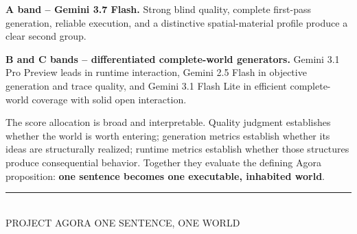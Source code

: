 \documentclass[11pt,a4paper]{article}
\begin{document}
\vspace{3mm}
\colorbox{AgoraPaleCoral}{%
  \parbox{0.96\textwidth}{%
    \vspace{3mm}\hspace{3mm}\begin{minipage}{0.91\textwidth}
    \sffamily\color{AgoraInk}
    \textbf{A band -- Gemini 3.7 Flash.} Strong blind quality, complete first-pass generation,
    reliable execution, and a distinctive spatial-material profile produce a clear second group.
    \end{minipage}\vspace{3mm}}}

\vspace{3mm}
\colorbox{AgoraPaleGold}{%
  \parbox{0.96\textwidth}{%
    \vspace{3mm}\hspace{3mm}\begin{minipage}{0.91\textwidth}
    \sffamily\color{AgoraInk}
    \textbf{B and C bands -- differentiated complete-world generators.} Gemini 3.1 Pro Preview
    leads in runtime interaction, Gemini 2.5 Flash in objective generation and trace quality, and
    Gemini 3.1 Flash Lite in efficient complete-world coverage with solid open interaction.
    \end{minipage}\vspace{3mm}}}

\vspace{5mm}
The score allocation is broad and interpretable. Quality judgment establishes whether the world is
worth entering; generation metrics establish whether its ideas are structurally realized; runtime
metrics establish whether those structures produce consequential behavior. Together they evaluate
the defining Agora proposition: \textbf{one sentence becomes one executable, inhabited world}.

\vfill
\begin{center}
  {\color{AgoraLine}\rule{0.72\textwidth}{0.6pt}}\\[4mm]
  {\sffamily\small\color{AgoraMuted}PROJECT AGORA \quad ONE SENTENCE, ONE WORLD}
\end{center}
\end{document}
